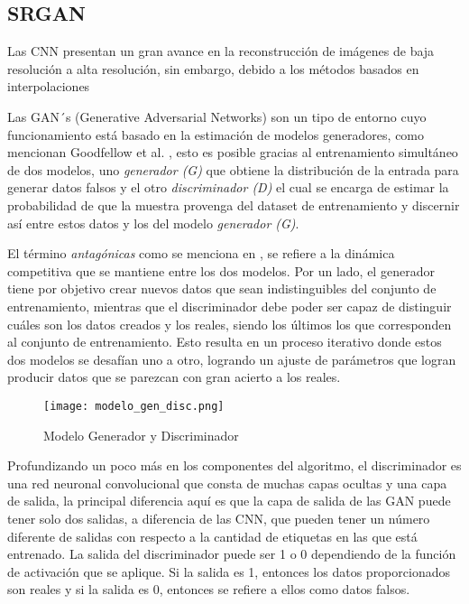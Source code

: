 \subsection{SRGAN}


Las CNN presentan un gran avance en la reconstrucción de imágenes de baja resolución a alta resolución,
sin embargo, debido a los métodos basados en interpolaciones 


Las GAN´s (Generative Adversarial Networks) son un tipo de entorno cuyo funcionamiento está basado
en la estimación de modelos generadores, como mencionan Goodfellow et al. \cite{GANs}, esto es 
posible gracias al entrenamiento simultáneo de dos modelos, uno \emph{generador (G)} que obtiene 
la distribución de la entrada para generar datos falsos y el otro \emph{discriminador (D)} el cual se encarga de estimar 
la probabilidad de que la muestra provenga del dataset de entrenamiento y discernir así entre estos datos y 
los del modelo \emph{ generador (G)}.

El término \emph{antagónicas} como se menciona en \cite{SRGAN_Tesis}, se refiere a la dinámica 
competitiva que se mantiene entre los dos modelos. Por un lado,
el generador tiene por objetivo crear nuevos datos que sean indistinguibles del
conjunto de entrenamiento, mientras que el discriminador debe poder ser capaz
de distinguir cuáles son los datos creados y los reales, siendo los últimos los que corresponden
 al conjunto de entrenamiento. Esto resulta en un proceso iterativo donde estos dos modelos
 se desafían uno a otro, logrando un ajuste de parámetros
 que logran producir datos que se parezcan con gran acierto a los reales.
 

\begin{figure}[H]
    \begin{center}
      \texttt{[image: modelo\_gen\_disc.png]}
      \caption{Modelo Generador y Discriminador}
      \label{Alexis1}
    \end{center}
\end{figure}

Profundizando un poco más en los componentes del algoritmo, el discriminador es una red neuronal convolucional que consta de muchas 
capas ocultas y una capa de salida, la principal diferencia aquí es que la capa de salida de las GAN puede tener solo dos salidas, 
a diferencia de las CNN, que pueden tener un número diferente de salidas con respecto a la cantidad de etiquetas en las que está entrenado.
La salida del discriminador puede ser 1 o 0 dependiendo de la función de activación que se aplique. Si la salida es 1, 
entonces los datos proporcionados son reales y si la salida es 0, entonces se refiere a ellos como datos falsos.

